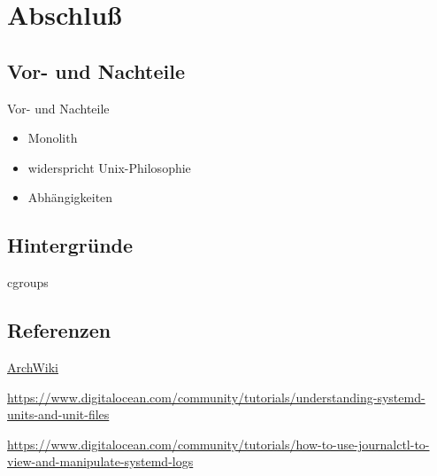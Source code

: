 \section{Abschluß}
\subsection{Vor- und Nachteile}

\begin{frame}{Vor- und Nachteile}
\begin{itemize}
\item Monolith
\item widerspricht Unix-Philosophie
\item Abhängigkeiten
\end{itemize}
\end{frame}

\subsection{Hintergründe}

\begin{frame}
cgroups
\end{frame}

\subsection{Referenzen}

\begin{frame}
\href{https://wiki.archlinux.org/index.php/systemd}{ArchWiki}

\href{https://www.digitalocean.com/community/tutorials/understanding-systemd-units-and-unit-files}{https://www.digitalocean.com/community/tutorials/understanding-systemd-units-and-unit-files}

\href{https://www.digitalocean.com/community/tutorials/how-to-use-journalctl-to-view-and-manipulate-systemd-logs}{https://www.digitalocean.com/community/tutorials/how-to-use-journalctl-to-view-and-manipulate-systemd-logs}
\end{frame}




